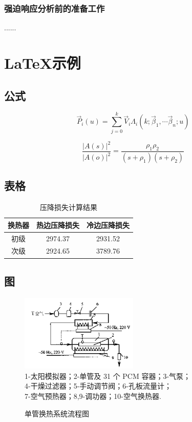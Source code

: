 \documentclass[doctor, openright, twoside]{gdutthesis}
\begin{document}
\subsection{强迫响应分析前的准备工作}
......\par

\chapter{\LaTeX 示例}
\section{公式}
\begin{equation}
\vec{P}_{i}(u)=\sum_{j=0}^{k} \vec{V}_{i} \Lambda_{i}\left(k ; \vec{\beta}_{1}, \cdots \vec{\beta}_{n} ; u\right)
\end{equation}

\begin{equation}
\frac{|A(s)|^{2}}{|A(o)|^{2}}=\frac{\rho_{1} \rho_{2}}{\left(s+\rho_{1}\right)\left(s+\rho_{2}\right)}
\end{equation}

\section{表格}

\begin{table}[h]
\centering
\caption{压降损失计算结果}
\label{table:jiangya}
\begin{tabularx}{\textwidth}{CCC}
\toprule[2pt]
换热器&热边压降损失&冷边压降损失\\
\midrule[1pt]
初级&2974.37&2931.52\\
次级&2924.65&3789.76\\
\bottomrule[2pt]
\end{tabularx}
\end{table}

\section{图}


\begin{figure}[!h]
\centering
\includegraphics[width=0.5\textwidth]{figures/danguan}\\
\footnotesize
1-太阳模拟器；2-单管及 31 个 PCM 容器；3-气泵；\\
4-干燥过滤器；5-手动调节阀；6-孔板流量计；\\
7-空气预热器；8,9-调功器；10-空气换热器.\\
\caption{单管换热系统流程图}
\label{fig:danguan}
\end{figure}
\end{document}
